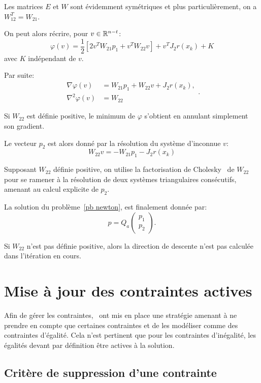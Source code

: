 Les matrices $E$ et $W$ sont évidemment symétriques et plus particulièrement, on a $W_{12}^T = W_{21}$.

On peut alors récrire, pour $v \in \mathbb{R}^{n-t}$: \[\varphi(v) = \dfrac{1}{2} \left[2v^TW_{21}p_1 + v^TW_{22}v\right] + v^TJ_2r(x_{k}) + K\] avec $K$ indépendant de $v$. 

Par suite:
\[ \begin{aligned}\nabla \varphi(v) &= W_{21}p_1 + W_{22}v + J_2r(x_{k}), \\
\nabla^2 \varphi(v) &= W_{22} \end{aligned}.\]

Si $W_{22}$ est définie positive, le minimum de $\varphi$ s'obtient en annulant simplement son gradient. 

Le vecteur $p_{2}$ est alors donné par la résolution du système d'inconnue $v$: $$W_{22}v = -W_{21}p_{1} -  J_2r(x_{k})$$ 

Supposant $W_{22}$ définie positive, on utilise la factorisation de Cholesky~\cite{goluvanl13} de $W_{22}$ pour se ramener à la résolution de deux systèmes triangulaires consécutifs,
amenant au calcul explicite de $p_2$.

La solution du problème~\eqref{pb newton}, est finalement donnée par:
\begin{equation} 
    p = Q_{a}\begin{pmatrix}p_{1}\\ p_{2} \end{pmatrix}.
\end{equation}

Si $W_{22}$ n'est pas définie positive, alors la direction de descente n'est pas calculée dans l'itération en cours.

\section{Mise à jour des contraintes actives}\label{update_actives}

Afin de gérer les contraintes,~\citet{lindwedin88} ont mis en place une stratégie amenant à ne prendre en compte que certaines contraintes et de les 
modéliser comme des contraintes d'égalité. Cela n'est pertinent que pour les contraintes d'inégalité, les égalités devant par définition être actives à la solution.

\subsection{Critère de suppression d'une contrainte} \label{criteresupr}

